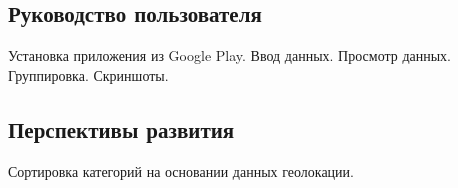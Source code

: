 \subsection{Руководство пользователя}

{\color{red}
  Установка приложения из Google Play.
  Ввод данных. Просмотр данных. Группировка.
  Скриншоты.
}

\subsection{Перспективы развития}

{\color{red}
  Сортировка категорий на основании данных геолокации.
}
